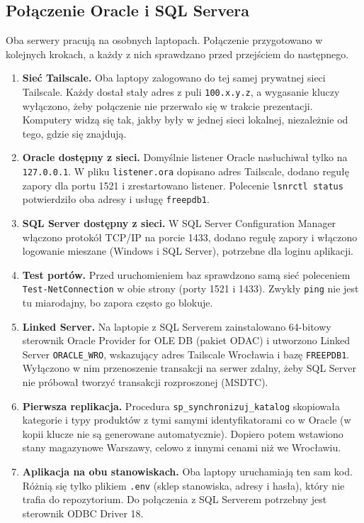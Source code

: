 \documentclass[11pt,a4paper]{article}
\begin{document}
\subsection{Połączenie Oracle i SQL Servera}
Oba serwery pracują na osobnych laptopach. Połączenie przygotowano w kolejnych krokach,
a każdy z nich sprawdzano przed przejściem do następnego.

\begin{enumerate}
  \item \textbf{Sieć Tailscale.} Oba laptopy zalogowano do tej samej prywatnej sieci
        Tailscale. Każdy dostał stały adres z puli \texttt{100.x.y.z}, a wygasanie
        kluczy wyłączono, żeby połączenie nie przerwało się w trakcie prezentacji.
        Komputery widzą się tak, jakby były w jednej sieci lokalnej, niezależnie
        od tego, gdzie się znajdują.
  \item \textbf{Oracle dostępny z sieci.} Domyślnie listener Oracle nasłuchiwał tylko
        na \texttt{127.0.0.1}. W pliku \texttt{listener.ora} dopisano adres Tailscale,
        dodano regułę zapory dla portu 1521 i zrestartowano listener. Polecenie
        \texttt{lsnrctl status} potwierdziło oba adresy i usługę \texttt{freepdb1}.
  \item \textbf{SQL Server dostępny z sieci.} W SQL Server Configuration Manager
        włączono protokół TCP/IP na porcie 1433, dodano regułę zapory i włączono
        logowanie mieszane (Windows i SQL Server), potrzebne dla loginu aplikacji.
  \item \textbf{Test portów.} Przed uruchomieniem baz sprawdzono samą sieć poleceniem
        \texttt{Test-NetConnection} w obie strony (porty 1521 i 1433). Zwykły
        \texttt{ping} nie jest tu miarodajny, bo zapora często go blokuje.
  \item \textbf{Linked Server.} Na laptopie z SQL Serverem zainstalowano 64-bitowy
        sterownik Oracle Provider for OLE DB (pakiet ODAC) i utworzono Linked Server
        \texttt{ORACLE\_WRO}, wskazujący adres Tailscale Wrocławia i bazę
        \texttt{FREEPDB1}. Wyłączono w nim przenoszenie transakcji na serwer zdalny,
        żeby SQL Server nie próbował tworzyć transakcji rozproszonej (MSDTC).
  \item \textbf{Pierwsza replikacja.} Procedura \texttt{sp\_synchronizuj\_katalog}
        skopiowała kategorie i typy produktów z tymi samymi identyfikatorami co w Oracle
        (w kopii klucze nie są generowane automatycznie). Dopiero potem wstawiono stany
        magazynowe Warszawy, celowo z innymi cenami niż we Wrocławiu.
  \item \textbf{Aplikacja na obu stanowiskach.} Oba laptopy uruchamiają ten sam kod.
        Różnią się tylko plikiem \texttt{.env} (sklep stanowiska, adresy i hasła), który
        nie trafia do repozytorium. Do połączenia z SQL Serverem potrzebny jest sterownik
        ODBC Driver 18.
\end{enumerate}
\end{document}
